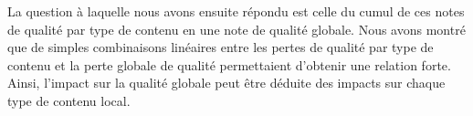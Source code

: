 La question à laquelle nous avons ensuite répondu est celle du cumul de ces notes de qualité par type de contenu en une note de qualité globale. Nous avons montré que de simples combinaisons linéaires entre les pertes de qualité par type de contenu et la perte globale de qualité permettaient d'obtenir une relation forte. Ainsi, l'impact sur la qualité globale peut être déduite des impacts sur chaque type de contenu local.




\ornementChapitre
